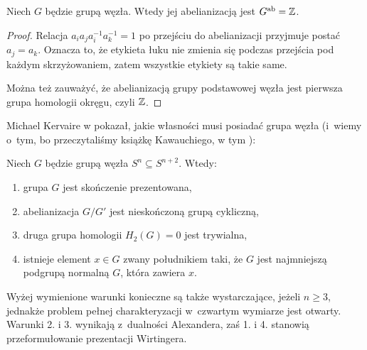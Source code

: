 \begin{corollary}
    Niech $G$ będzie grupą węzła.
    Wtedy jej abelianizacją jest $G^{\operatorname{ab}} = \mathbb Z$.
\end{corollary}

\begin{proof}
    Relacja $a_ia_ja_i^{-1}a_k^{-1}=1$ po przejściu do abelianizacji przyjmuje postać $a_j = a_k$.
    Oznacza to, że etykieta łuku nie zmienia się podczas przejścia pod każdym skrzyżowaniem, zatem wszystkie etykiety są takie same.

    Można też zauważyć, że abelianizacją grupy podstawowej węzła jest pierwsza grupa homologii okręgu, czyli $\mathbb Z$.
\end{proof}

Michael Kervaire w \cite{kervaire65} pokazał, jakie własności musi posiadać grupa węzła (i~wiemy o~tym, bo przeczytaliśmy książkę Kawauchiego, w tym \cite[tw. 14.1.1]{kawauchi96}):

\begin{proposition}
    Niech $G$ będzie grupą węzła $S^n \subseteq S^{n+2}$.
    Wtedy:
    \begin{enumerate}[leftmargin=*]
        \itemsep0em
        \item grupa $G$ jest skończenie prezentowana,
        \item abelianizacja $G/G'$ jest nieskończoną grupą cykliczną,
        \item druga grupa homologii $H_2(G) = 0$ jest trywialna,
        \item istnieje element $x \in G$ zwany południkiem taki, że $G$ jest najmniejszą podgrupą normalną $G$, która zawiera $x$.
    \end{enumerate}
\end{proposition}

Wyżej wymienione warunki konieczne są także wystarczające, jeżeli $n \ge 3$, jednakże problem pełnej charakteryzacji w~czwartym wymiarze jest otwarty.
Warunki 2. i 3. wynikają z~dualności Alexandera, zaś 1. i 4. stanowią przeformułowanie prezentacji Wirtingera.



